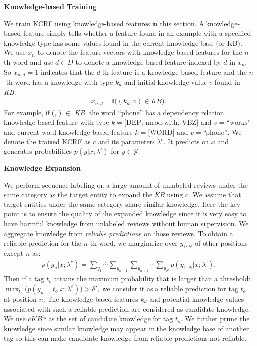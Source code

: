 \textbf{Knowledge-based Training}

We train KCRF using knowledge-based features in this section. A knowledge-based feature simply tells whether a feature found in an example with a specified knowledge type has some values found in the current knowledge base (or KB). We use $x_n$ to denote the feature vectors with knowledge-based features for the $n$-th word and use $d\in D$ to denote a knowledge-based feature indexed by $d$ in $x_n$. So $x_{n,d}=1$ indicates that the $d$-th feature is a knowledge-based feature and the $n$-th word has a knowledge with type $k_d$ and initial knowledge value $v$ found in \textit{KB}: 
\begin{equation} \label{eq:kb}
\begin{split}
x_{n, d}=\mathbb{I}\big( (k_d, v) \in \textit{KB} \big) .
\end{split}
\end{equation}
For example, if (, ) $\in$ \textit{KB}, the word ``phone'' has a dependency relation knowledge-based feature with type $k=\text{[DEP, nmod:with, VBZ]}$ and $v=\text{``works''}$ and current word knowledge-based feature $k=\text{[WORD]}$ and $v=\text{``phone''}$. We denote the trained KCRF as $c$ and its parameters $\lambda^c$. It predicts on $x$ and generates probabilities $p(y|x; \lambda^c)$ for $y \in \mathcal Y$.

\textbf{Knowledge Expansion}

We perform sequence labeling on a large amount of unlabeled reviews under the same category as the target entity to expand the \textit{KB} using $c$. We assume that target entities under the same category share similar knowledge. Here the key point is to ensure the quality of the expanded knowledge since it is very easy to have harmful knowledge from unlabeled reviews without human supervision. We aggregate knowledge from \emph{reliable prediction}s on those reviews. To obtain a reliable prediction for the $n$-th word, we marginalize over $y_{1:N}$ of other positions except $n$ as:
\begin{equation} \label{eq:mar}
\begin{split}
p(y_n|x; \lambda^c)=\sum_{y_1} \cdots \sum_{y_{n-1}} \sum_{y_{n+1}} \cdots \sum_{y_N} p(y_{1:N}|x; \lambda^c).
\end{split}
\end{equation}
Then if a tag $t_o$ attains the maximum probability that is larger than a threshold:  
$ \max_{t_o}\big(p(y_n=t_o|x; \lambda^c)\big)>\delta',$
we consider it as a reliable prediction for tag $t_o$ at position $n$. The knowledge-based features $k_d$ and potential knowledge values associated with such a reliable prediction are considered as candidate knowledge. We use $\textit{cKB}^{t_o}$ as the set of candidate knowledge for tag $t_o$. We further prune the knowledge since similar knowledge may appear in the knowledge base of another tag so this can make candidate knowledge from reliable predictions not reliable. 

